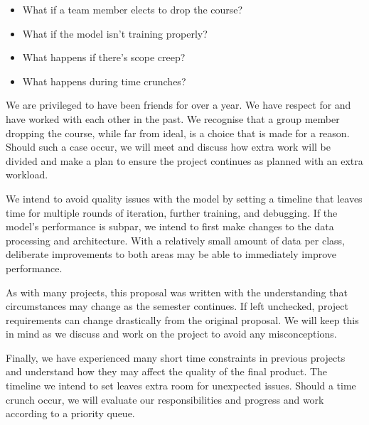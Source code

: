 \documentclass{article} %
\begin{document}
\begin{itemize}
  \item What if a team member elects to drop the course?
  \item What if the model isn't training properly?
  \item What happens if there's scope creep?
  \item What happens during time crunches?
\end{itemize}

We are privileged to have been friends for over a year. We have respect for and have worked with each other in the past. We recognise that a group member dropping the course, while far from ideal, is a choice that is made for a reason. Should such a case occur, we will meet and discuss how extra work will be divided and make a plan to ensure the project continues as planned with an extra workload.

We intend to avoid quality issues with the model by setting a timeline that leaves time for multiple rounds of iteration, further training, and debugging. If the model's performance is subpar, we intend to first make changes to the data processing and architecture. With a relatively small amount of data per class, deliberate improvements to both areas may be able to immediately improve performance.

As with many projects, this proposal was written with the understanding that circumstances may change as the semester continues. If left unchecked, project requirements can change drastically from the original proposal. We will keep this in mind as we discuss and work on the project to avoid any misconceptions.

Finally, we have experienced many short time constraints in previous projects and understand how they may affect the quality of the final product. The timeline we intend to set leaves extra room for unexpected issues. Should a time crunch occur, we will evaluate our responsibilities and progress and work according to a priority queue.

\label{last_page}



\end{document}
